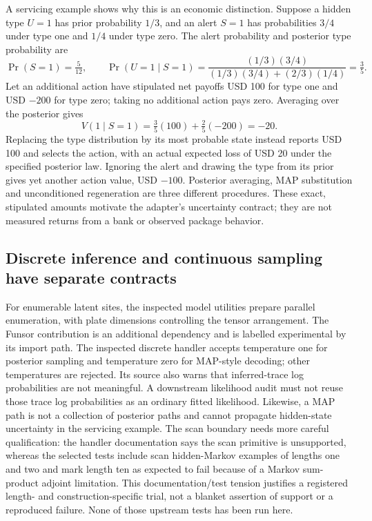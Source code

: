 A servicing example shows why this is an economic distinction. Suppose a hidden type $U=1$ has prior probability $1/3$, and an alert $S=1$ has probabilities $3/4$ under type one and $1/4$ under type zero. The alert probability and posterior type probability are
\begin{equation}
 \Pr(S=1)=\tfrac{5}{12},\qquad
 \Pr(U=1\mid S=1)=
 \frac{(1/3)(3/4)}{(1/3)(3/4)+(2/3)(1/4)}=\tfrac35.
\end{equation}
Let an additional action have stipulated net payoffs USD 100 for type one and USD $-200$ for type zero; taking no additional action pays zero. Averaging over the posterior gives
\begin{equation}
 V(1\mid S=1)=\tfrac35(100)+\tfrac25(-200)=-20.
\end{equation}
Replacing the type distribution by its most probable state instead reports USD 100 and selects the action, with an actual expected loss of USD 20 under the specified posterior law. Ignoring the alert and drawing the type from its prior gives yet another action value, USD $-100$. Posterior averaging, MAP substitution and unconditioned regeneration are three different procedures. These exact, stipulated amounts motivate the adapter's uncertainty contract; they are not measured returns from a bank or observed package behavior. \citep{exec23_numpyro_reference}

\subsection{Discrete inference and continuous sampling have separate contracts}

For enumerable latent sites, the inspected model utilities prepare parallel enumeration, with plate dimensions controlling the tensor arrangement. The Funsor contribution is an additional dependency and is labelled experimental by its import path. The inspected discrete handler accepts temperature one for posterior sampling and temperature zero for MAP-style decoding; other temperatures are rejected. Its source also warns that inferred-trace log probabilities are not meaningful. A downstream likelihood audit must not reuse those trace log probabilities as an ordinary fitted likelihood. Likewise, a MAP path is not a collection of posterior paths and cannot propagate hidden-state uncertainty in the servicing example. The scan boundary needs more careful qualification: the handler documentation says the scan primitive is unsupported, whereas the selected tests include scan hidden-Markov examples of lengths one and two and mark length ten as expected to fail because of a Markov sum-product adjoint limitation. This documentation/test tension justifies a registered length- and construction-specific trial, not a blanket assertion of support or a reproduced failure. None of those upstream tests has been run here. \citep{exec23_numpyro_sources}


